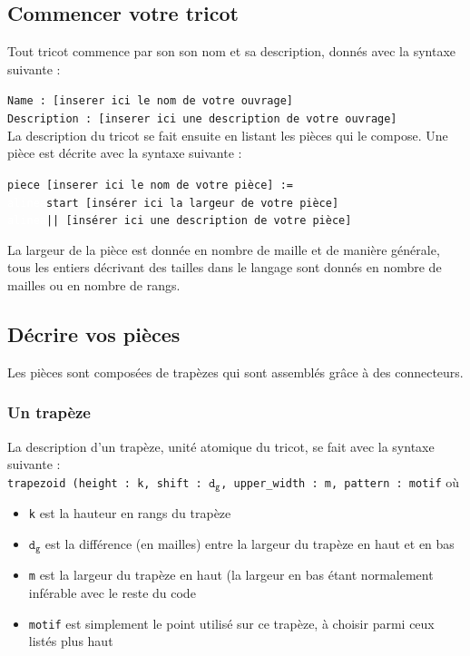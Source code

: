 \documentclass[a4paper,10pt]{article}
\begin{document}
  \subsection{Commencer votre tricot}
  
Tout tricot commence par son son nom et sa description, donnés avec la syntaxe suivante :

\noindent \texttt{Name : [inserer ici le nom de votre ouvrage] \\
  Description : [inserer ici une description de votre ouvrage]} \\

La description du tricot se fait ensuite en listant les pièces qui le compose. Une pièce est décrite avec la syntaxe suivante :

\noindent \texttt{piece [inserer ici le nom de votre pièce] := \\
  \textcolor{white}{alinea}start [insérer ici la largeur de votre pièce] \\
  \textcolor{white}{alinea}|| [insérer ici une description de votre pièce]}
  
La largeur de la pièce est donnée en nombre de maille et de manière générale, tous les entiers décrivant des tailles dans le langage sont donnés en nombre de mailles ou en nombre de rangs.

  \subsection{Décrire vos pièces}
  
  Les pièces sont composées de trapèzes qui sont assemblés grâce à des connecteurs.

\subsubsection{Un trapèze}

  La description d'un trapèze, unité atomique du tricot, se fait avec la syntaxe suivante : \\
\texttt{trapezoid (height : k, shift : $\mathtt{d_g}$, upper\_width : m, pattern : motif} où 
\begin{itemize}
\item \texttt{k} est la hauteur en rangs du trapèze
\item $\mathtt{d_g}$ est la différence (en mailles) entre la largeur du trapèze en haut et en bas
\item \texttt{m} est la largeur du trapèze en haut (la largeur en bas étant normalement inférable avec le reste du code
\item \texttt{motif} est simplement le point utilisé sur ce trapèze, à choisir parmi ceux listés plus haut
\end{itemize}
\end{document}
